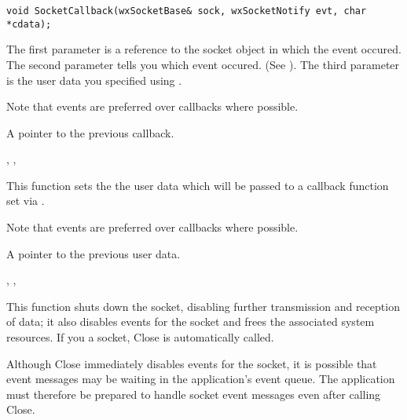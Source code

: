 \begin{verbatim}
void SocketCallback(wxSocketBase& sock, wxSocketNotify evt, char *cdata);
\end{verbatim}

The first parameter is a reference to the socket object in which the
event occured. The second parameter tells you which event occured.
(See ). The third parameter
is the user data you specified using
.

Note that events are preferred over callbacks where possible.


A pointer to the previous callback.


, 
, 

%
%
\label{wxsocketbasecallbackdata}


This function sets the the user data which will be passed to a
callback function set via .

Note that events are preferred over callbacks where possible.


A pointer to the previous user data.

, 
, 

%
%
\label{wxsocketbaseclose}


This function shuts down the socket, disabling further transmission and
reception of data; it also disables events for the socket and frees the
associated system resources. If you 
a socket, Close is automatically called.


Although Close immediately disables events for the socket, it is possible
that event messages may be waiting in the application's event queue. The
application must therefore be prepared to handle socket event messages
even after calling Close.


